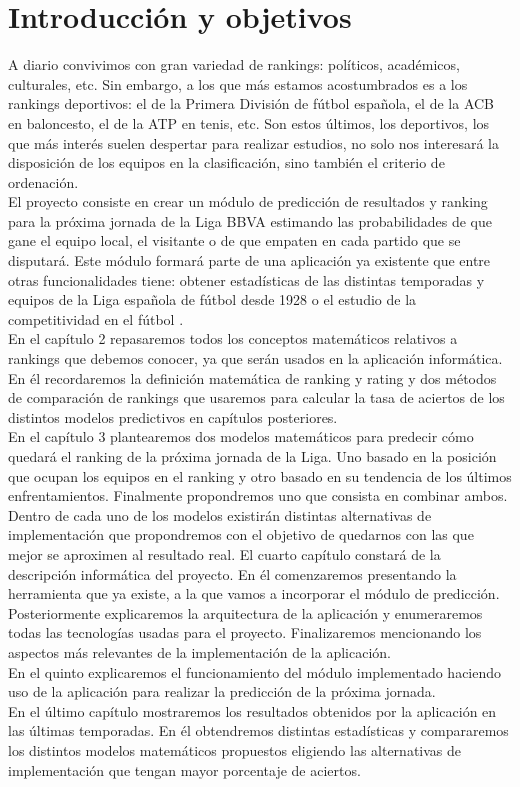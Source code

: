 \chapter{Introducción y objetivos}
A diario convivimos con gran variedad de rankings: políticos, académicos, culturales, etc. Sin embargo, a los que más estamos acostumbrados es a los rankings deportivos: el de la Primera División de fútbol española, el de la ACB en baloncesto, el de la ATP en tenis, etc. Son estos últimos, los deportivos, los que más interés suelen despertar para realizar estudios, no solo nos interesará la disposición de los equipos en la clasificación, sino también el criterio de ordenación.\\ 

El proyecto consiste en crear un módulo de predicción de resultados y ranking para la próxima jornada de la Liga BBVA estimando las probabilidades de que gane el equipo local, el visitante o de que empaten en cada partido que se disputará. Este módulo formará parte de una aplicación ya existente que entre otras funcionalidades tiene: obtener estadísticas de las distintas temporadas y equipos de la Liga española de fútbol desde 1928 o el estudio de la competitividad en el fútbol \cite{tfgjose}.\\ 

En el capítulo 2 repasaremos todos los conceptos matemáticos relativos a rankings que debemos conocer, ya que serán usados en la aplicación informática.
En él recordaremos la definición matemática de ranking y rating y dos métodos de comparación de rankings que usaremos para calcular la tasa de aciertos de los distintos modelos predictivos en capítulos posteriores.\\ 

En el capítulo 3 plantearemos dos modelos matemáticos para predecir cómo quedará el ranking de la próxima jornada de la Liga. Uno basado en la posición que ocupan los equipos en el ranking y otro basado en su tendencia de los últimos enfrentamientos. Finalmente propondremos uno que consista en combinar ambos. Dentro de cada uno de los modelos existirán distintas alternativas de implementación que propondremos con el objetivo de quedarnos con las que mejor se aproximen al resultado real. 
\newpage
El cuarto capítulo constará de la descripción informática del proyecto. En él comenzaremos presentando la herramienta que ya existe, a la que vamos a incorporar el  módulo de predicción. Posteriormente explicaremos la arquitectura de la aplicación y enumeraremos todas las tecnologías usadas para el proyecto. Finalizaremos mencionando los aspectos más relevantes de la implementación de la aplicación.\\

En el quinto explicaremos el funcionamiento del módulo implementado haciendo uso de la aplicación para realizar la predicción de la próxima jornada.\\

En el último capítulo mostraremos los resultados obtenidos por la aplicación en las últimas temporadas. En él obtendremos distintas estadísticas y compararemos los distintos modelos matemáticos propuestos eligiendo las alternativas de implementación que tengan mayor porcentaje de aciertos.\\

